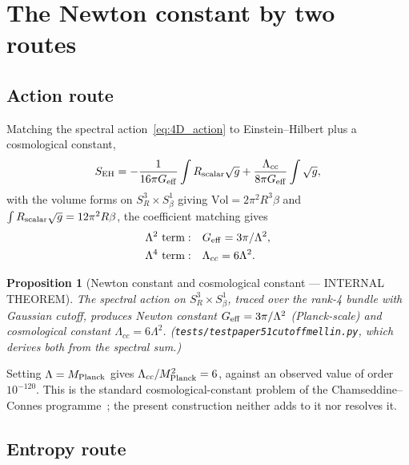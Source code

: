 \documentclass[11pt,a4paper]{article}
\theoremstyle{plain}
\newtheorem{proposition}[theorem]{Proposition}
\theoremstyle{definition}
\newcommand{\sthree}{S^{3}}
\newcommand{\Lcc}{\Lambda_{cc}}
\newcommand{\Geff}{G_{\rm eff}}
\renewcommand{\_}{\textunderscore\allowbreak}
\begin{document}
\section{The Newton constant by two routes}
\label{sec:g4}

\subsection{Action route}
\label{sec:g7}

Matching the spectral action~\eqref{eq:4D_action} to Einstein--Hilbert
plus a cosmological constant,
\begin{equation}
  S_{\rm EH} = -\frac{1}{16 \pi G_{\rm eff}} \int R_{\rm scalar} \sqrt{g}
              + \frac{\Lcc}{8 \pi G_{\rm eff}} \int \sqrt{g},
\end{equation}
with the volume forms on $\sthree_R \times S^1_\beta$ giving
$\mathrm{Vol} = 2 \pi^2 R^3 \beta$ and
$\int R_{\rm scalar} \sqrt{g} = 12 \pi^2 R \beta$, the coefficient
matching gives
\begin{align}
  \Lambda^2 \text{ term}: &\quad \Geff = 3 \pi / \Lambda^2, \\
  \Lambda^4 \text{ term}: &\quad \Lcc = 6 \Lambda^2.
\end{align}

\begin{proposition}[Newton constant and cosmological constant ---
INTERNAL THEOREM]
\label{prop:newton_cc}
The spectral action on $\sthree_R \times S^1_\beta$, traced over the rank-4
bundle with Gaussian cutoff, produces Newton constant
$\Geff = 3 \pi / \Lambda^2$ (Planck-scale) and cosmological constant
$\Lcc = 6 \Lambda^2$. (\texttt{tests/test\_paper51\_cutoff\_mellin.py},
which derives both from the spectral sum.)
\end{proposition}

Setting $\Lambda = M_{\rm Planck}$ gives $\Lcc / M_{\rm Planck}^2 = 6$,
against an observed value of order $10^{-120}$. This is the standard
cosmological-constant problem of the Chamseddine--Connes
programme~\cite{chamseddine_connes2010}; the present construction neither
adds to it nor resolves it.

\subsection{Entropy route}
\label{subsec:entropy_route}
\end{document}
